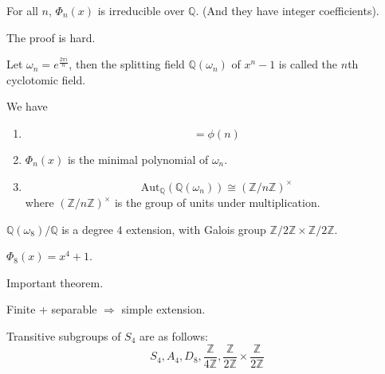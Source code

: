 \documentclass[openany]{book}
\newcommand{\Z}{\mathbb{Z}}
\newcommand{\Q}{\mathbb{Q}}
\newcommand{\aut}{\text{Aut}}
\newcommand{\om}{\omega}
\begin{document}

\begin{prop}
    For all $n$, $\Phi_n(x)$ is irreducible over $\Q$. (And they have integer coefficients).
\end{prop}
The proof is hard.


\begin{defn}
    Let $\om_n=e^\frac{2\pi i}{n}$, then the splitting field $\Q(\om_n)$ of $x^n-1$ is called the $n$th cyclotomic field.
\end{defn}

\begin{prop}
    We have 
    \begin{enumerate}
        \item \begin{equation*}
            [\Q(\om_n):\Q]=\phi(n)
        \end{equation*}
        \item $\Phi_n(x)$ is the minimal polynomial of $\om_n$.
        \item \begin{equation*}
            \aut_\Q(\Q(\om_n))\cong(\Z/n\Z)^\times
        \end{equation*}
        where $(\Z/n\Z)^\times$ is the group of units under multiplication.
    \end{enumerate}
\end{prop}

\begin{example}
    $\Q(\om_8)/\Q$ is a degree $4$ extension, with Galois group $\Z/2\Z\times\Z/2\Z$.
\end{example}
$\Phi_8(x)=x^4+1$.

\begin{warn}
    Important theorem.
\end{warn}

\begin{prop}
    Finite + separable $\Rightarrow$ simple extension.
\end{prop}


\begin{prop}
    Transitive subgroups of $S_4$ are as follows:
    \begin{equation*}
        S_4, A_4, D_8, \frac{\Z}{4\Z}, \frac{\Z}{2\Z}\times\frac{\Z}{2\Z}
    \end{equation*}
\end{prop}
\end{document}
